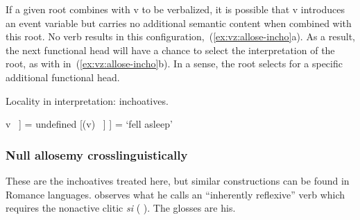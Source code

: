 \begin{exe}
\begin{xlist}
\begin{xlist}
\begin{exe}
\begin{xlist}
\begin{xlist}
\begin{exe}
\begin{xlist}
\begin{xlist}
\begin{exe}
\begin{exe}
\begin{xlist}
\begin{exe}
\begin{exe}
\begin{xlist}
\begin{exe}
\begin{exe}
\begin{exe}
\begin{exe}
\begin{exe}
\begin{xlist}
\begin{exe}
\begin{xlist}
\begin{exe}
\begin{exe}
\begin{xlist}
\begin{exe}
\begin{xlist}
\begin{exe}
\begin{xlist}
\begin{exe}
\begin{exe}
\begin{exe}
\begin{xlist}
\begin{exe}
\begin{exe}
\begin{exe}
\begin{xlist}
If a given root combines with v to be verbalized, it is possible that v introduces an event variable but carries no additional semantic content when combined with this root. No verb results in this configuration,~(\ref{ex:vz:allose-incho}a). As a result, the next functional head will have a chance to select the interpretation of the root, as with {\vz} in~(\ref{ex:vz:allose-incho}b). In a sense, the root selects for a specific additional functional head.
 \begin{exe}
 \ex  Locality in interpretation: inchoatives.\label{ex:vz:allose-incho} 
 \begin{xlist} 
     \ex  {[}v ~\!] = undefined 
     \ex  {[}\textbf{\vz} [(v) ~\!] ] = `fell asleep' 
 \z
\z 

\subsubsection{Null allosemy crosslinguistically}
These are the inchoatives treated here, but similar constructions can be found in Romance languages. \cite{burzio86} observes what he calls an ``inherently reflexive'' verb which requires the nonactive clitic \emph{si} ( ). The glosses are his.
 \begin{exe}
 \ex  {}
 \begin{xlist} 
	
	
	
 \z
{} 
	

\end{xlist}
\end{exe}
\end{xlist}
\end{exe}
\end{xlist}
\end{exe}
\end{exe}
\end{exe}
\end{xlist}
\end{exe}
\end{exe}
\end{exe}
\end{xlist}
\end{exe}
\end{xlist}
\end{exe}
\end{xlist}
\end{exe}
\end{exe}
\end{xlist}
\end{exe}
\end{xlist}
\end{exe}
\end{exe}
\end{exe}
\end{exe}
\end{exe}
\end{xlist}
\end{exe}
\end{exe}
\end{xlist}
\end{exe}
\end{exe}
\end{xlist}
\end{xlist}
\end{exe}
\end{xlist}
\end{xlist}
\end{exe}
\end{xlist}
\end{xlist}
\end{exe}
